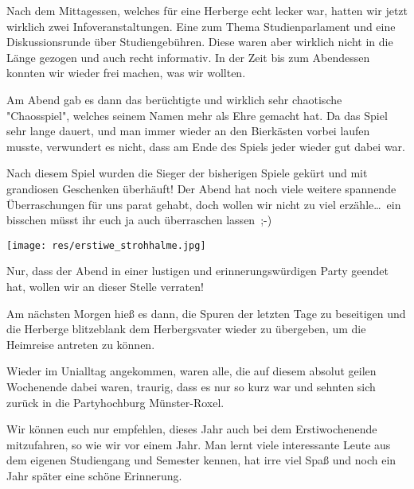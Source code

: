 \begin{multicols}{2}
\begin{center}
\end{center}

Nach dem Mittagessen, welches für eine Herberge echt lecker war, hatten wir jetzt wirklich zwei Infoveranstaltungen. Eine zum Thema Studienparlament und eine Diskussionsrunde über Studiengebühren. Diese waren aber wirklich nicht in die Länge gezogen und auch recht informativ. In der Zeit bis zum Abendessen konnten wir wieder frei machen, was wir wollten.


Am Abend gab es dann das berüchtigte und wirklich sehr chaotische "Chaosspiel", welches seinem Namen mehr als Ehre gemacht hat. Da das Spiel sehr lange dauert, und man immer wieder an den Bierkästen vorbei laufen musste, verwundert es nicht, dass am Ende des Spiels jeder wieder gut dabei war.

Nach diesem Spiel wurden die Sieger der bisherigen Spiele gekürt und mit grandiosen Geschenken überhäuft! Der Abend hat noch viele weitere spannende Überraschungen für uns parat gehabt, doch wollen wir nicht zu viel erzähle\dots\ ein bisschen müsst ihr euch ja auch überraschen lassen~;-)

\texttt{[image: res/erstiwe\_strohhalme.jpg]}

Nur, dass der Abend in einer lustigen und erinnerungswürdigen Party geendet hat, wollen wir an dieser Stelle verraten!

Am nächsten Morgen hieß es dann, die Spuren der letzten Tage zu beseitigen und die Herberge blitzeblank dem Herbergsvater wieder zu übergeben, um die Heimreise antreten zu können.

Wieder im Unialltag angekommen, waren alle, die auf diesem absolut geilen Wochenende dabei waren, traurig, dass es nur so kurz war und sehnten sich zurück in die Partyhochburg Münster-Roxel.

Wir können euch nur empfehlen, dieses Jahr auch bei dem Erstiwochenende mitzufahren, so wie wir vor einem Jahr. Man lernt viele interessante Leute aus dem eigenen Studiengang und Semester kennen, hat irre viel Spaß und noch ein Jahr später eine schöne Erinnerung.

\begin{center}
\large{}
\end{center}

\vspace{-7pt}
\end{multicols}

